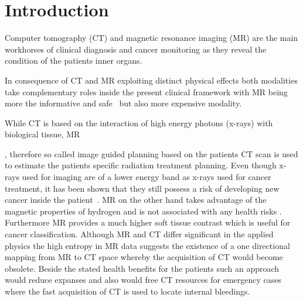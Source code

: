 \section{Introduction}

Computer tomography (CT) and magnetic resonance imaging (MR) are the main
workhorses of clinical diagnosis and cancer monitoring as they reveal the
condition of the patients inner organs.

In consequence of CT and MR exploiting distinct physical effects both
modalities take complementary roles inside the present clinical framework
with MR being more the informative and safe~\cite{Hartwig09} but also
more expensive modality.


While CT is based on the interaction of high energy photons (x-rays) with
biological tissue, MR 


, therefore so called image guided planning based on the
patients CT scan is used to estimate the patients specific radiation treatment
planning. Even though x-rays used for imaging are of a lower energy band
as x-rays used for cancer treatment, it has been shown that they still possess
a risk of developing new cancer inside the patient~\cite{Martin06}.
MR on the other hand takes advantage of the magnetic properties of hydrogen
and is not associated with any health risks . Furthermore MR
provides a much higher soft tissue contrast which is useful for cancer
classification. Although MR and CT differ significant in the applied
physics the high entropy in MR data suggests the existence of a one
directional mapping from MR to CT space whereby the acquisition of CT would
become obsolete. Beside the stated health benefits for the patients such an
approach would reduce expanses and also would free CT resources for
emergency cases where the fast acquisition of CT is used to locate internal
bleedings.
